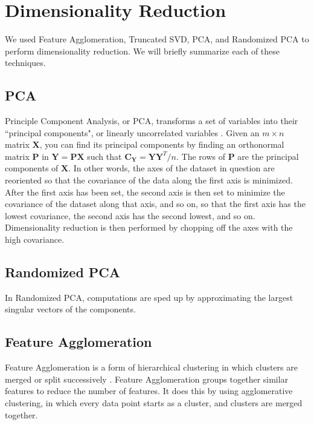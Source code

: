 \documentclass[12pt]{article}
\begin{document}
\section{Dimensionality Reduction}

We used Feature Agglomeration, Truncated SVD, PCA, and Randomized PCA to
perform dimensionality reduction. We will briefly summarize each of these
techniques.

\subsection{PCA}

Principle Component Analysis, or PCA, transforms a set of variables into their
``principal components", or linearly uncorrelated variables \cite{shlens2014pca}. Given an $m \times n$ matrix $\mathbf{X}$, you can find its principal components by finding an orthonormal matrix $\mathbf{P}$ in $ \mathbf{Y} = \mathbf{PX} $ such that $\mathbf{C_Y} = \mathbf{YY}^T/n$. The rows of $\mathbf{P}$ are the principal components of $\mathbf{X}$. In other words,
the axes of the dataset in question are reoriented so that the covariance of the data along the first axis is minimized. After the first axis has been set, the second axis is then set to
minimize the covariance of the dataset along that axis, and so on, so
that the first axis has the lowest covariance, the second axis has the
second lowest, and so on. Dimensionality reduction is then performed by
chopping off the axes with the high covariance.

\subsection{Randomized PCA}

In Randomized PCA, computations are sped up by approximating the largest singular vectors of the components.

\subsection{Feature Agglomeration}

Feature Agglomeration is a form of hierarchical clustering in which clusters are merged or split successively \cite{featureagglomeration}. Feature Agglomeration groups together similar features to reduce the number of
features. It does this by using agglomerative clustering, in which every data
point starts as a cluster, and clusters are merged together.
\end{document}

